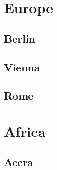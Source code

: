 \documentclass[12pt]{article}
\begin{document}
	\section{Europe}
	\subsection{Berlin}
	\lipsum[6-8]
	\subsection{Vienna}
	\lipsum[10]
	\subsection{Rome}
	\lipsum[15]
	\section{Africa}
	\lipsum[1-4]
	\subsection{Accra}
	\lipsum[5-8]
\end{document}
